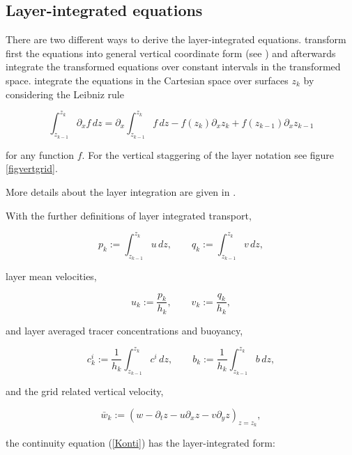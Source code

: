 \subsection{Layer-integrated equations}\label{SectionLayerIntegrated} 

There are two different ways to derive the layer-integrated
equations. \cite{BURCHARDea97} transform first the
equations into general vertical coordinate form
(see \cite{DELEERSNIJDERea92})
and afterwards
integrate the transformed equations over constant intervals in
the transformed space. \cite{LANDERea94} integrate the
equations in the Cartesian space over surfaces $z_k$ by
considering the Leibniz rule

\begin{equation}\label{Leibniz}
\int_{z_{k-1}}^{z_k}\partial_x f\,dz
=
\partial_x\int_{z_{k-1}}^{z_k} f\,dz
-f(z_k)\partial_xz_k
+f(z_{k-1})\partial_xz_{k-1}
\end{equation}

for any function $f$.
For the vertical staggering of the layer notation see figure
\ref{figvertgrid}.

More details about the layer integration are given in
\cite{BURCHARDea97}.

With the further definitions of layer integrated transport,

\begin{equation}\label{pqdef} 
p_k:=\int_{z_{k-1}}^{z_k}u\,dz,\qquad
q_k:=\int_{z_{k-1}}^{z_k}v\,dz,
\end{equation}

layer mean velocities,

\begin{equation}\label{ukvkdef} 
u_k:=\frac{p_k}{h_k},\qquad v_k:=\frac{q_k}{h_k},
\end{equation}

and layer averaged tracer concentrations and buoyancy,

\begin{equation}\label{ckbkdef} 
c^i_k:=\frac{1}{h_k}\int_{z_{k-1}}^{z_k}c^i\,dz,\qquad
b_k:=\frac{1}{h_k}\int_{z_{k-1}}^{z_k}b\,dz,
\end{equation}

and the grid related vertical velocity,

\begin{equation}\label{barwdef} 
\bar w_k:=(w-\partial_tz-u\partial_xz-v\partial_yz)_{z=z_k},
\end{equation}

the continuity equation (\ref{Konti}) has the layer-integrated form:


